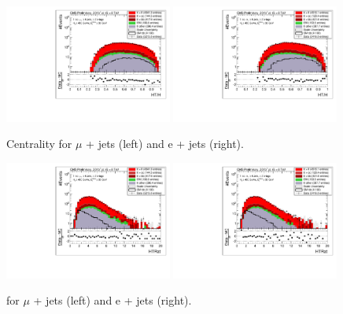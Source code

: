 \begin{figure}[!ht]
    \includegraphics[clip, trim=0.15cm 0.15cm 0.15cm 0.1cm, width=0.49\textwidth]{images/Run1/HTH_StackLogY_Mu.pdf}
    \includegraphics[clip, trim=0.15cm 0.15cm 0.15cm 0.1cm, width=0.49\textwidth]{images/Run1/HTH_StackLogY_e.pdf}
    \caption{Centrality for $\mu$ + jets (left) and e + jets (right).}
    \label{fig:centrality}
\end{figure}

\begin{figure}[!ht]
    \includegraphics[clip, trim=0.15cm 0.15cm 0.15cm 0.1cm, width=0.49\textwidth]{images/Run1/HTRat_StackLogY_Mu.pdf}
    \includegraphics[clip, trim=0.15cm 0.15cm 0.15cm 0.1cm, width=0.49\textwidth]{images/Run1/HTRat_StackLogY_e.pdf}
    \caption{\HTrat for $\mu$ + jets (left) and e + jets (right).}
    \label{fig:HTrat}
\end{figure}

